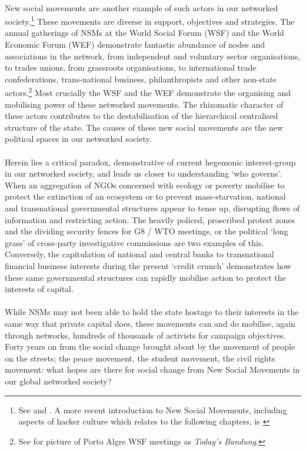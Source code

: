 \documentclass[11pt,titlepage]{book}
\begin{document}
\paragraph{}New social movements are another example of such actors in our networked society.\footnote{See \cite{Dalton:1990zr} and \cite{Eder:1993fj}. A more recent introduction to New Social Movements, including aspects of hacker culture which relates to the following chapters, is \cite{Porta:2006kx}} These movements are diverse in support, objectives and strategies. The annual gatherings of NSMs at the World Social Forum (WSF) and the World Economic Forum (WEF) demonstrate fantastic abundance of nodes and associations in the network, from independent and voluntary sector organisations, to trades unions, from grassroots organisations, to international trade confederations, trans-national business, philanthropists and other non-state actors.\footnote{See \cite{Hardt:2002} for picture of Porto Algre WSF meetings as \textit{Today's Bandung}.} Most crucially the WSF and the WEF demonstrate the organising and mobilising power of these networked movements. The rhizomatic character of these actors contributes to the destabilisation of the hierarchical centralised structure of the state. The causes of these new social movements are the new political spaces in our networked society.

\paragraph{}Herein lies a critical paradox, demonstrative of current hegemonic interest-group in our networked society, and leads us closer to understanding `who governs'. When an aggregation of NGOs concerned with ecology or poverty mobilise to protect the extinction of an ecosystem or to prevent mass-starvation, national and transnational governmental structures appear to tense up, disrupting flows of information and restricting action. The heavily policed, proscribed protest zones and the dividing security fences for G8 / WTO meetings, or the political `long grass' of cross-party investigative commissions are two examples of this. Conversely, the capitulation of national and central banks to transnational financial business interests during the present `credit crunch' demonstrates how these same governmental structures can rapidly mobilise action to protect the interests of capital.

\paragraph{}While NSMs may not been able to hold the state hostage to their interests in the same way that private capital does, these movements can and do mobilise, again through networks, hundreds of thousands of activists for campaign objectives. Forty years on from the social change brought about by the movement of people on the streets; the peace movement, the student movement, the civil rights movement: what hopes are there for social change from New Social Movements in our global networked society?
\end{document}
